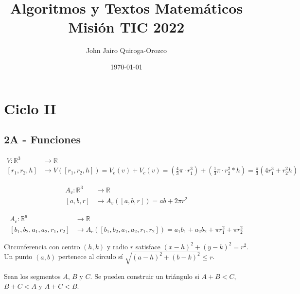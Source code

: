 \documentclass[12pt,a4paper]{article}
\title{\Huge Algoritmos y Textos Matemáticos \\Misión TIC 2022}
\author{	John Jairo Quiroga-Orozco}
\date{\small{\today}}
\newcommand{\R}{\mathbb{R}}
\begin{document}
	
	\maketitle
	
\section{Ciclo II}

\subsection{2A - Funciones}

\begin{equation} \label{eq1}
	\begin{split}
		V:\R^{3}&\to \R\\
		   [r_{1},r_{2},h] & \to V\left([r_{1},r_{2},h]\right)=V_{e}(v)+V_{c}(v)=\left(\frac{4}{3}\pi\cdot r_{1}^{3}\right)+\left(\frac{1}{3}\pi\cdot r_{2}^{2}*h\right)=\frac{\pi}{3}\left(4r^{3}_{1}+r^{2}_{2}h\right) 
	\end{split}
\end{equation}


\begin{equation} \label{eq2}
	\begin{split}
		A_{v}:\R^{3} &\to \R \\
		[a,b,r]&\to A_{v}\left([a,b,r]\right)=ab+2\pi r^{2}
	\end{split}
\end{equation}

\begin{equation} \label{eq2}
	\begin{split}
		A_{c}:\R^{6} &\to \R \\
		[b_{1},b_{2},a_{1},a_{2},r_{1},r_{2}]&\to A_{c}\left([b_{1},b_{2},a_{1},a_{2},r_{1},r_{2}]\right)=a_{1}b_{1}+a_{2}b_{2}+\pi r_{1}^{2}+\pi r_{2}^{2}
	\end{split}
\end{equation}

Circunferencia con centro $(h,k)$ y radio $r$ satisface $(x-h)^{2}+(y-k)^{2}=r^{2}$. Un punto $(a,b)$ pertenece al círculo sí $\sqrt{(a-h)^{2}+(b-k)^{2}}\leq r$.

Sean los segmentos $A$, $B$ y $C$. Se pueden construir un triángulo si $A+B<C$, $B+C<A$ y $A+C<B$.
	
	
\end{document}
